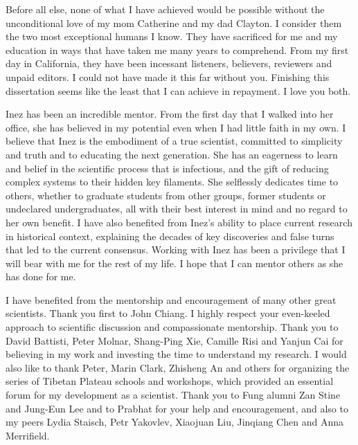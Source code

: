\documentclass{ucbthesis}
\begin{document}
\begin{frontmatter}



\tableofcontents
\clearpage
\listoffigures
\clearpage
\listoftables

\begin{acknowledgements}
Before all else, none of what I have achieved would be possible without the unconditional love of my mom Catherine and my dad Clayton. I consider them the two most exceptional humans I know. They have sacrificed for me and my education in ways that have taken me many years to comprehend. From my first day in California, they have been incessant listeners, believers, reviewers and unpaid editors. I could not have made it this far without you. Finishing this dissertation seems like the least that I can achieve in repayment. I love you both.

Inez has been an incredible mentor. From the first day that I walked into her office, she has believed in my potential even when I had little faith in my own. I believe that Inez is the embodiment of a true scientist, committed to simplicity and truth and to educating the next generation. She has an eagerness to learn and belief in the scientific process that is infectious, and the gift of reducing complex systems to their hidden key filaments. She selflessly dedicates time to others, whether to graduate students from other groups, former students or undeclared undergraduates, all with their best interest in mind and no regard to her own benefit. I have also benefited from Inez's ability to place current research in historical context, explaining the decades of key discoveries and false turns that led to the current consensus. Working with Inez has been a privilege that I will bear with me for the rest of my life. I hope that I can mentor others as she has done for me.

I have benefited from the mentorship and encouragement of many other great scientists. Thank you first to John Chiang. I highly respect your even-keeled approach to scientific discussion and compassionate mentorship. Thank you to David Battisti, Peter Molnar, Shang-Ping Xie, Camille Risi and Yanjun Cai for believing in my work and investing the time to understand my research. I would also like to thank Peter, Marin Clark, Zhisheng An and others for organizing the series of Tibetan Plateau schools and workshops, which provided an essential forum for my development as a scientist. Thank you to Fung alumni Zan Stine and Jung-Eun Lee and to Prabhat for your help and encouragement, and also to my peers Lydia Staisch, Petr Yakovlev, Xiaojuan Liu, Jinqiang Chen and Anna Merrifield.


\end{acknowledgements}
\end{frontmatter}
\end{document}
